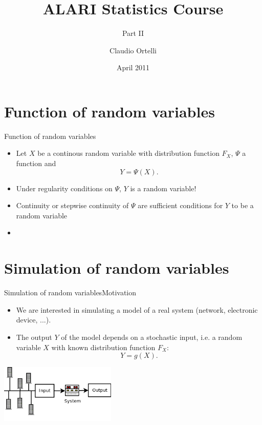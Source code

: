 \documentclass[handout]{beamer}
\title[ALARI Statistics Course]{ALARI Statistics Course}
\subtitle{Part II}
\author[Claudio Ortelli]{Claudio Ortelli}
\institute[USI]{Universit\`{a} della Svizzera italiana}
\date[29/2010]{April 2011}
\begin{document}
\maketitle
\section{Function of random variables}
\begin{frame}{Function of random variables}
\begin{itemize}
  \item Let $X$ be a continous random variable with distribution function
  $F_X$, $\Psi$ a function and \[ Y = \Psi(X) .\]
  \item Under regularity conditions on $\Psi$, $Y$ is a random variable!
  \item Continuity or stepwise continuity of $\Psi$ are sufficient conditions
  for $Y$ to be a random variable
  \item 
\end{itemize}
\end{frame}

 
\section{Simulation of random variables}
\begin{frame}{Simulation of random variables}{Motivation}
\begin{itemize}
 \item We are interested in simulating a model of a real system (network, electronic device, ...).
 \item The output $Y$ of the model depends on a stochastic input, i.e. a random variable $X$ with known distribution 
function $F_X$: 
\[ Y = g(X). \]
\end{itemize}
\begin{center}
 \includegraphics[width=157pt,keepaspectratio=true]{./sistemaComplesso.png}
\end{center}
\end{frame}
\end{document}
